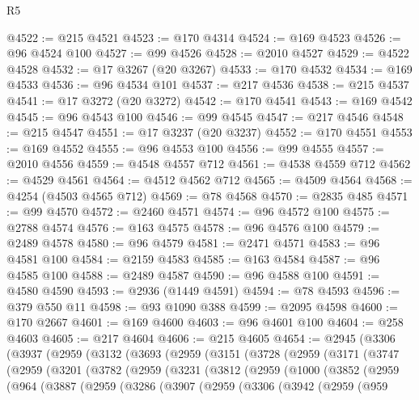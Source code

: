 \begin{lexlean}{R5}
\begin{coremodule}
@4522 := @215 @4521
@4523 := @170 @4314
@4524 := @169 @4523
@4526 := @96 @4524 @100
@4527 := @99 @4526
@4528 := @2010 @4527
@4529 := @4522 @4528
@4532 := @17 @3267 (@20 @3267)
@4533 := @170 @4532
@4534 := @169 @4533
@4536 := @96 @4534 @101
@4537 := @217 @4536
@4538 := @215 @4537
@4541 := @17 @3272 (@20 @3272)
@4542 := @170 @4541
@4543 := @169 @4542
@4545 := @96 @4543 @100
@4546 := @99 @4545
@4547 := @217 @4546
@4548 := @215 @4547
@4551 := @17 @3237 (@20 @3237)
@4552 := @170 @4551
@4553 := @169 @4552
@4555 := @96 @4553 @100
@4556 := @99 @4555
@4557 := @2010 @4556
@4559 := @4548 @4557 @712
@4561 := @4538 @4559 @712
@4562 := @4529 @4561
@4564 := @4512 @4562 @712
@4565 := @4509 @4564
@4568 := @4254 (@4503 @4565 @712)
@4569 := @78 @4568
@4570 := @2835 @485
@4571 := @99 @4570
@4572 := @2460 @4571
@4574 := @96 @4572 @100
@4575 := @2788 @4574
@4576 := @163 @4575
@4578 := @96 @4576 @100
@4579 := @2489 @4578
@4580 := @96 @4579
@4581 := @2471 @4571
@4583 := @96 @4581 @100
@4584 := @2159 @4583
@4585 := @163 @4584
@4587 := @96 @4585 @100
@4588 := @2489 @4587
@4590 := @96 @4588 @100
@4591 := @4580 @4590
@4593 := @2936 (@1449 @4591)
@4594 := @78 @4593
@4596 := @379 @550 @11
@4598 := @93 @1090 @388
@4599 := @2095 @4598
@4600 := @170 @2667
@4601 := @169 @4600
@4603 := @96 @4601 @100
@4604 := @258 @4603
@4605 := @217 @4604
@4606 := @215 @4605
@4654 := @2945
    (@3306
      (@3937
        (@2959
          (@3132
            (@3693
              (@2959
                (@3151
                  (@3728
                    (@2959
                      (@3171
                        (@3747
                          (@2959
                            (@3201
                              (@3782
                                (@2959
                                  (@3231
                                    (@3812
                                      (@2959
                                        (@1000
                                          (@3852
                                            (@2959
                                              (@964
                                                (@3887
                                                  (@2959
                                                    (@3286
                                                      (@3907
                                                        (@2959
                                                          (@3306
                                                            (@3942
                                                              (@2959
                                                                (@959

\end{coremodule}
\end{lexlean}
